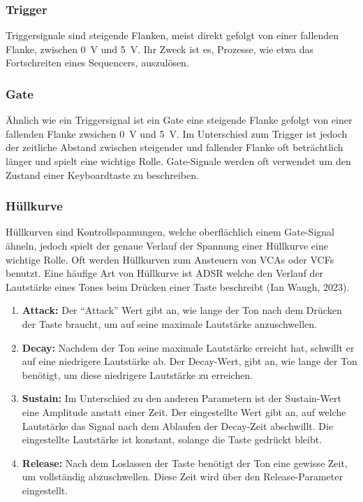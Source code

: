 \subsubsection{Trigger}
\label{sec:orgf3d1f73}
Triggersignale sind steigende Flanken, meist direkt gefolgt von einer fallenden Flanke, zwischen \SI{0}{\volt} und \SI{5}{\volt}. Ihr Zweck ist es, Prozesse, wie etwa das Fortschreiten eines Sequencers, auszulösen.

\subsubsection{Gate}
\label{sec:org6c1212b}
Ähnlich wie ein Triggersignal ist ein Gate eine steigende Flanke gefolgt von einer fallenden Flanke zwsichen \SI{0}{\volt} und \SI{5}{\volt}. Im Unterschied zum Trigger ist jedoch der zeitliche Abstand zwischen steigender und fallender Flanke oft beträchtlich länger und spielt eine wichtige Rolle. Gate-Signale werden oft verwendet um den Zustand einer Keyboardtaste zu beschreiben.

\subsubsection{Hüllkurve}
\label{sec:orgbcdb4fa}
Hüllkurven sind Kontrollspannungen, welche oberflächlich einem Gate-Signal ähneln, jedoch spielt der genaue Verlauf der Spannung einer Hüllkurve eine wichtige Rolle. Oft werden Hüllkurven zum Ansteuern von \acp{VCA} oder \acp{VCF} benutzt. Eine häufige Art von Hüllkurve ist \ac{ADSR} welche den Verlauf der Lautstärke eines Tones beim Drücken einer Taste beschreibt (Ian Waugh, 2023).

\begin{enumerate}
\item \textbf{Attack:}
\label{sec:org384dc12}
Der "`Attack"' Wert gibt an, wie lange der Ton nach dem Drücken der Taste braucht, um auf seine maximale Lautstärke anzuschwellen.

\item \textbf{Decay:}
\label{sec:orgab57a8c}
Nachdem der Ton seine maximale Lautstärke erreicht hat, schwillt er auf eine niedrigere Lautstärke ab. Der Decay-Wert, gibt an, wie lange der Ton benötigt, um diese niedrigere Lautstärke zu erreichen.

\item \textbf{Sustain:}
\label{sec:orgc20d2f7}
Im Unterschied zu den anderen Parametern ist der Sustain-Wert eine Amplitude anstatt einer Zeit. Der eingestellte Wert gibt an, auf welche Lautstärke das Signal nach dem Ablaufen der Decay-Zeit abschwillt. Die eingestellte Lautstärke ist konstant, solange die Taste gedrückt bleibt.

\item \textbf{Release:}
\label{sec:orgd3b47e1}
Nach dem Loslassen der Taste benötigt der Ton eine gewisse Zeit, um vollständig abzuschwellen.  Diese Zeit wird über den Release-Parameter eingestellt.
\end{enumerate}


